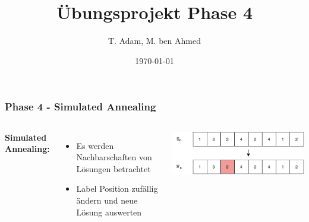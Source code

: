 \documentclass[aspectratio=169]{beamer}
\title[Übungsprojekt Phase 4]{Übungsprojekt Phase 4} %
\author{T. Adam, M. ben Ahmed} %
\institute[UOS] %
{

Universität Osnabrück \\ %

\medskip
\textit{Æ} %


}
\date{\today} %
\begin{document}
\begin{frame}
\titlepage %
\end{frame}




\begin{frame}
\frametitle{Phase 4 - Simulated Annealing}
\begin{columns}[c] %
	
	\textbf{Simulated Annealing:}
	\begin{itemize}
		\item Es werden Nachbarschaften von Lösungen  betrachtet
		\item Label Position zufällig ändern und neue Lösung auswerten
	\end{itemize}
	\includegraphics[scale=.6]{sa_representation.pdf}
	
	
	
\end{columns}
\end{frame}
\end{document}
